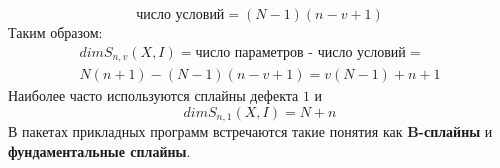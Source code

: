 \begin{equation}
\textit{число условий} = (N-1)(n-v+1)
\end{equation}
Таким образом:
\begin{equation}
\begin{aligned}dim S_{n,v}(X,I) = \textit{число параметров - число условий} =\\
 N(n+1)-(N-1)(n-v+1)=v(N-1)+n+1\end{aligned}
\end{equation}
Наиболее часто используются сплайны дефекта $1$ и
\begin{equation}
dim  S_{n,1}(X,I) = N+n
\end{equation}
В пакетах прикладных программ встречаются такие понятия как \textbf{B-сплайны} и \textbf{фундаментальные сплайны}.